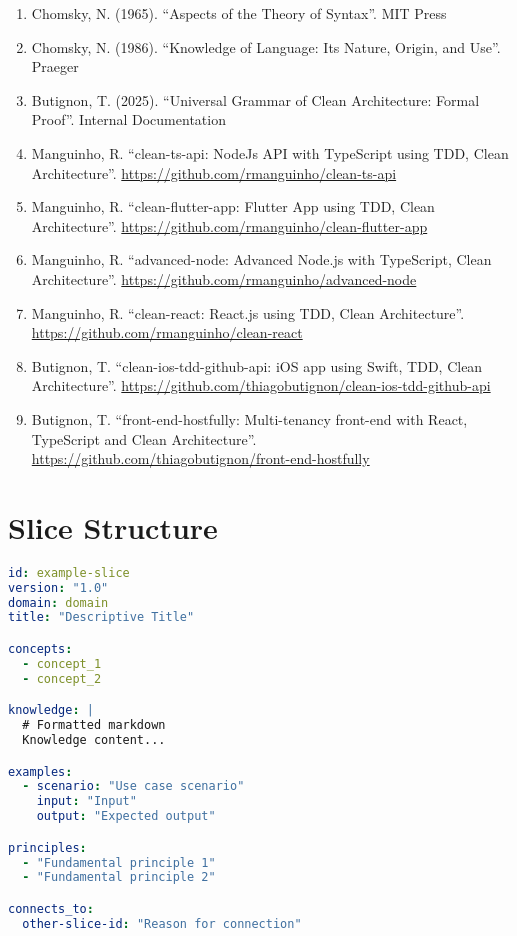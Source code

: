 \documentclass[11pt]{article}
\begin{document}
\begin{enumerate}
    \item Chomsky, N. (1965). ``Aspects of the Theory of Syntax''. MIT Press
    \item Chomsky, N. (1986). ``Knowledge of Language: Its Nature, Origin, and Use''. Praeger
    \item Butignon, T. (2025). ``Universal Grammar of Clean Architecture: Formal Proof''. Internal Documentation
    \item Manguinho, R. ``clean-ts-api: NodeJs API with TypeScript using TDD, Clean Architecture''. \url{https://github.com/rmanguinho/clean-ts-api}
    \item Manguinho, R. ``clean-flutter-app: Flutter App using TDD, Clean Architecture''. \url{https://github.com/rmanguinho/clean-flutter-app}
    \item Manguinho, R. ``advanced-node: Advanced Node.js with TypeScript, Clean Architecture''. \url{https://github.com/rmanguinho/advanced-node}
    \item Manguinho, R. ``clean-react: React.js using TDD, Clean Architecture''. \url{https://github.com/rmanguinho/clean-react}
    \item Butignon, T. ``clean-ios-tdd-github-api: iOS app using Swift, TDD, Clean Architecture''. \url{https://github.com/thiagobutignon/clean-ios-tdd-github-api}
    \item Butignon, T. ``front-end-hostfully: Multi-tenancy front-end with React, TypeScript and Clean Architecture''. \url{https://github.com/thiagobutignon/front-end-hostfully}
\end{enumerate}

\appendix

\section{Slice Structure}

\begin{lstlisting}[language=yaml]
id: example-slice
version: "1.0"
domain: domain
title: "Descriptive Title"

concepts:
  - concept_1
  - concept_2

knowledge: |
  # Formatted markdown
  Knowledge content...

examples:
  - scenario: "Use case scenario"
    input: "Input"
    output: "Expected output"

principles:
  - "Fundamental principle 1"
  - "Fundamental principle 2"

connects_to:
  other-slice-id: "Reason for connection"
\end{lstlisting}
\end{document}
